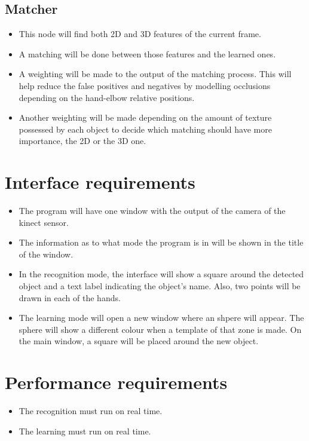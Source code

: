 \documentclass{article}
\begin{document}
\subsection{Matcher}
\begin{itemize}
	\item This node will find both 2D and 3D features of the current frame. 
	\item A matching will be done between those features and the learned ones. 
	\item A weighting will be made to the output of the matching process. This will help reduce the false positives and negatives by modelling occlusions depending on the hand-elbow relative positions. 
	\item Another weighting will be made depending on the amount of texture possessed by each object to decide which matching should have more importance, the 2D or the 3D one. 

\end{itemize}

\section{Interface requirements}

\begin{itemize}
\item The program will have one window with the output of the camera of the kinect sensor. 
\item The information as to what mode the program is in will be shown in the title of the window.
\item In the recognition mode, the interface will show a square around the detected object and a text label indicating the object's name. Also, two points will be drawn in each of the hands. 
\item The learning mode will open a new window where an shpere will appear. The sphere will show a different colour when a template of that zone is made. On the main window, a square will be placed around the new object. 

\end{itemize}





\section{Performance requirements}

\begin{itemize}
\item The recognition must run on real time.
\item The learning must run on real time. 
\end{itemize}
\end{document}
